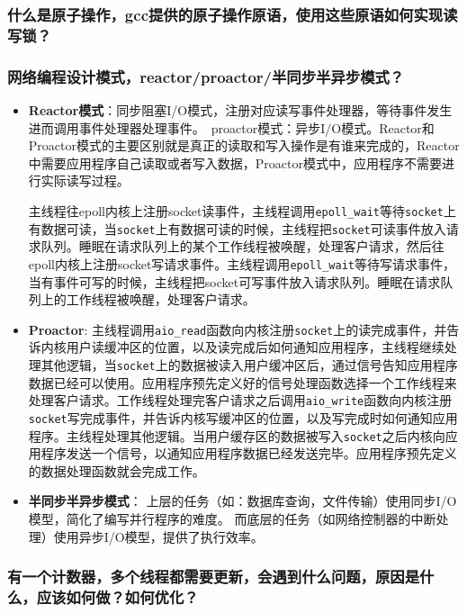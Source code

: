 \documentclass[UTF8,a4paper,8pt]{ctexart}
\begin{document}
		\subsubsection{什么是原子操作，gcc提供的原子操作原语，使用这些原语如何实现读写锁？}
		
		\subsubsection{网络编程设计模式，reactor/proactor/半同步半异步模式？}
			\begin{itemize}
				\item \textbf{Reactor模式}：同步阻塞I/O模式，注册对应读写事件处理器，等待事件发生进而调用事件处理器处理事件。 proactor模式：异步I/O模式。Reactor和Proactor模式的主要区别就是真正的读取和写入操作是有谁来完成的，Reactor中需要应用程序自己读取或者写入数据，Proactor模式中，应用程序不需要进行实际读写过程。
				
				主线程往epoll内核上注册socket读事件，主线程调用\verb|epoll_wait|等待\verb|socket|上有数据可读，当\verb|socket|上有数据可读的时候，主线程把\verb|socket|可读事件放入请求队列。睡眠在请求队列上的某个工作线程被唤醒，处理客户请求，然后往epoll内核上注册socket写请求事件。主线程调用\verb|epoll_wait|等待写请求事件，当有事件可写的时候，主线程把socket可写事件放入请求队列。睡眠在请求队列上的工作线程被唤醒，处理客户请求。
				\item \textbf{Proactor}:
				主线程调用\verb|aio_read|函数向内核注册\verb|socket|上的读完成事件，并告诉内核用户读缓冲区的位置，以及读完成后如何通知应用程序，主线程继续处理其他逻辑，当\verb|socket|上的数据被读入用户缓冲区后，通过信号告知应用程序数据已经可以使用。应用程序预先定义好的信号处理函数选择一个工作线程来处理客户请求。工作线程处理完客户请求之后调用\verb|aio_write|函数向内核注册\verb|socket|写完成事件，并告诉内核写缓冲区的位置，以及写完成时如何通知应用程序。主线程处理其他逻辑。当用户缓存区的数据被写入\verb|socket|之后内核向应用程序发送一个信号，以通知应用程序数据已经发送完毕。应用程序预先定义的数据处理函数就会完成工作。
				
				\item \textbf{半同步半异步模式}：
				上层的任务（如：数据库查询，文件传输）使用同步I/O模型，简化了编写并行程序的难度。
				而底层的任务（如网络控制器的中断处理）使用异步I/O模型，提供了执行效率。
			\end{itemize}
			
		
			
			
		\subsubsection{有一个计数器，多个线程都需要更新，会遇到什么问题，原因是什么，应该如何做？如何优化？}
		
\end{document}

